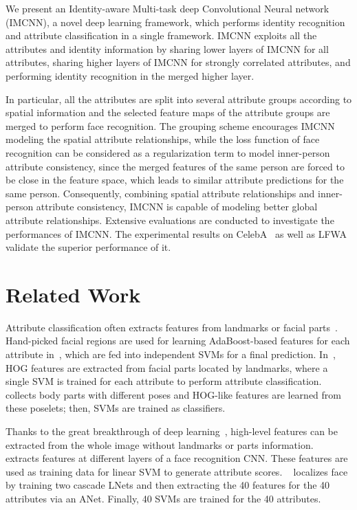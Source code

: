 \documentclass[wcp]{jmlr}
\begin{document}
	We present an Identity-aware Multi-task deep Convolutional Neural network (IMCNN), a novel deep learning framework, which performs identity recognition and attribute classification in a single framework. IMCNN exploits all the attributes and identity information by sharing lower layers of IMCNN for all attributes, sharing higher layers of IMCNN for strongly correlated attributes, and performing identity recognition in the merged higher layer.
	
	In particular, all the attributes are split into several attribute groups according to spatial information and the selected feature maps of the attribute groups are merged to perform face recognition. The grouping scheme encourages IMCNN modeling the spatial attribute relationships, while the loss function of face recognition can be considered as a regularization term to model inner-person attribute consistency, since the merged features of the same person are forced to be close in the feature space, which leads to similar attribute predictions for the same person. Consequently, combining spatial attribute relationships and inner-person attribute consistency, IMCNN is capable of modeling better global attribute relationships. Extensive evaluations are conducted to investigate the performances of IMCNN. The experimental results on CelebA~\cite{CelebA} as well as LFWA~\cite{LFW} validate the superior performance of it.
	
	\section{Related Work}
	Attribute classification often extracts features from landmarks or facial parts~\cite{POOF,poselet,2009attribute,panda}. Hand-picked facial regions are used for learning AdaBoost-based features for each attribute in~\cite{2009attribute}, which are fed into independent SVMs for a final prediction. In~\cite{POOF}, HOG features are extracted from facial parts located by landmarks, where a single SVM is trained for each attribute to perform attribute classification. ~\cite{poselet} collects body parts with different poses and HOG-like features are learned from these poselets; then, SVMs are trained as classifiers.
	
	Thanks to the great breakthrough of deep learning~\cite{AlexNet,GoogleNet,VGGNet,fastrcnn,fasterrcnn,CelebA,ClassificationCNN,AFFACT}, high-level features can be extracted from the whole image without landmarks or parts information. ~\cite{ClassificationCNN} extracts features at different layers of a face recognition CNN. These features are used as training data for linear SVM to generate attribute scores. ~\cite{CelebA} localizes face by training two cascade LNets and then extracting the 40 features for the 40 attributes via an ANet. Finally, 40 SVMs are trained for the 40 attributes.
	
\end{document}
